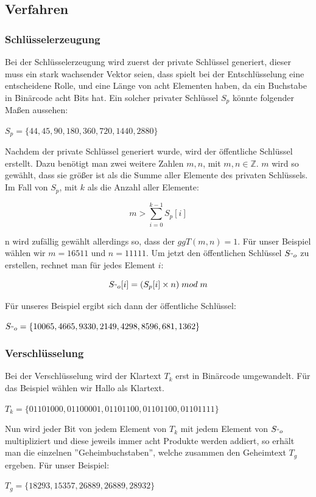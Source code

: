\documentclass[a4paper,12pt,titlepage]{article}
\begin{document}
\subsection{Verfahren}
\subsubsection{Schlüsselerzeugung}
Bei der Schlüsselerzeugung wird zuerst der private Schlüssel generiert, dieser muss ein stark wachsender Vektor seien, dass spielt bei der Entschlüsselung eine entscheidene Rolle, und eine Länge von acht Elementen haben, da ein Buchstabe in Binärcode acht Bits hat. Ein solcher privater Schlüssel $S_p$ könnte folgender Maßen aussehen:
\begin{center}
$S_p=\{44,45,90,180,360,720,1440,2880\}$
\end{center}
Nachdem der private Schlüssel generiert wurde, wird der öffentliche Schlüssel erstellt. Dazu benötigt man zwei weitere Zahlen $m,n$, mit $m,n \in \mathbb{Z}$. $m$ wird so gewählt, dass sie größer ist als die Summe aller Elemente des privaten Schlüssels. Im Fall von $S_p$, mit $k$ als die Anzahl aller Elemente:
\begin{center}
\[m > \sum_{i=0}^{k-1} S_p[i]\]
\end{center}
n wird zufällig gewählt allerdings so, dass der $ggT(m, n) = 1$.
Für unser Beispiel wählen wir $m = 16511$ und $n = 11111$. Um jetzt den öffentlichen Schlüssel $S_{"o}$ zu erstellen, rechnet man für jedes Element $i$:
\begin{center}
\[S_{"o}[i]=(S_p[i] \times n)\; mod \; m\]
\end{center}
Für unseres Beispiel ergibt sich dann der öffentliche Schlüssel:
\begin{center}
$S_{"o}=\{10065,4665,9330,2149,4298,8596,681,1362\}$
\end{center}

\subsubsection{Verschlüsselung}
Bei der Verschlüsselung wird der Klartext $T_k$ erst in Binärcode umgewandelt. Für das Beispiel wählen wir Hallo als Klartext.
\begin{center}
$T_k = \{01101000, 01100001, 01101100, 01101100, 01101111\}$
\end{center}
Nun wird jeder Bit von jedem Element von $T_k$ mit jedem Element von $S_{"o}$ multipliziert und diese jeweils immer acht Produkte werden addiert, so erhält man die einzelnen ''Geheimbuchstaben'', welche zusammen den Geheimtext $T_g$ ergeben.
Für unser Beispiel:
\begin{center}
$T_g=\{18293,15357,26889,26889,28932\}$
\end{center}
\end{document}
